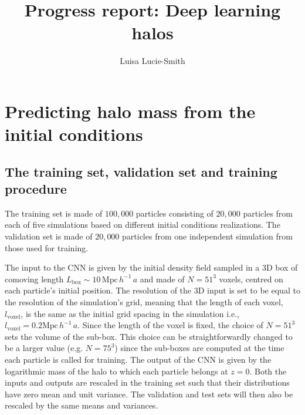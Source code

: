 \documentclass[11pt]{article}
\title{Progress report: Deep learning halos}
\author{Luisa Lucie-Smith}
\begin{document}
\maketitle

\section{Predicting halo mass from the initial conditions}

\subsection{The training set, validation set and training procedure}

The training set is made of $100,000$ particles consisting of $20,000$ particles from each of five simulations based on different initial conditions realizations. The validation set is made of $20,000$ particles from one independent simulation from those used for training.

The input to the CNN is given by the initial density field sampled in a 3D box of comoving length $L_\mathrm{box} \sim 10 \, \mathrm{Mpc} \, h^{-1} \, a$ and made of $N = 51^{3}$ voxels, centred on each particle's initial position. The resolution of the 3D input is set to be equal to the resolution of the simulation's grid, meaning that the length of each voxel, $l_\mathrm{voxel}$, is the same as the initial grid spacing in the simulation i.e., $l_\mathrm{voxel} = 0.2 \mathrm{Mpc} \, h^{-1} \, a$. Since the length of the voxel is fixed, the choice of $N =51^3$ sets the volume of the sub-box. This choice can be straightforwardly changed to be a larger value (e.g. $N =75^3$) since the sub-boxes are computed at the time each particle is called for training. The output of the CNN is given by the logarithmic mass of the halo to which each particle belongs at $z=0$. Both the inputs and outputs are rescaled in the training set such that their distributions have zero mean and unit variance. The validation and test sets will then also be rescaled by the same means and variances.
\end{document}
